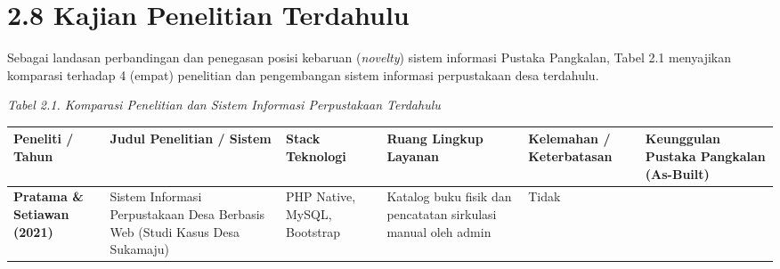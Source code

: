 \documentclass[
  indonesian,
  12pt,
]{report}
\newcounter{none} %
\begin{document}
\section{2.8 Kajian Penelitian
Terdahulu}\label{kajian-penelitian-terdahulu}

Sebagai landasan perbandingan dan penegasan posisi kebaruan
(\emph{novelty}) sistem informasi Pustaka Pangkalan, Tabel 2.1
menyajikan komparasi terhadap 4 (empat) penelitian dan pengembangan
sistem informasi perpustakaan desa terdahulu.

\emph{Tabel 2.1. Komparasi Penelitian dan Sistem Informasi Perpustakaan
Terdahulu}

{\def\LTcaptype{none} %
\begin{longtable}[]{@{}
  >{\raggedright\arraybackslash}p{}
  >{\raggedright\arraybackslash}p{}
  >{\raggedright\arraybackslash}p{}
  >{\raggedright\arraybackslash}p{}
  >{\raggedright\arraybackslash}p{}
  >{\raggedright\arraybackslash}p{}@{}}
\toprule\noalign{}
\begin{minipage}[b]{\linewidth}\raggedright
Peneliti / Tahun
\end{minipage} & \begin{minipage}[b]{\linewidth}\raggedright
Judul Penelitian / Sistem
\end{minipage} & \begin{minipage}[b]{\linewidth}\raggedright
Stack Teknologi
\end{minipage} & \begin{minipage}[b]{\linewidth}\raggedright
Ruang Lingkup Layanan
\end{minipage} & \begin{minipage}[b]{\linewidth}\raggedright
Kelemahan / Keterbatasan
\end{minipage} & \begin{minipage}[b]{\linewidth}\raggedright
Keunggulan Pustaka Pangkalan (As-Built)
\end{minipage} \\
\midrule\noalign{}
\endhead
\bottomrule\noalign{}
\endlastfoot
\textbf{Pratama \& Setiawan (2021)} & Sistem Informasi Perpustakaan Desa
Berbasis Web (Studi Kasus Desa Sukamaju) & PHP Native, MySQL, Bootstrap
& Katalog buku fisik dan pencatatan sirkulasi manual oleh admin & Tidak

\end{longtable}}
\end{document}
